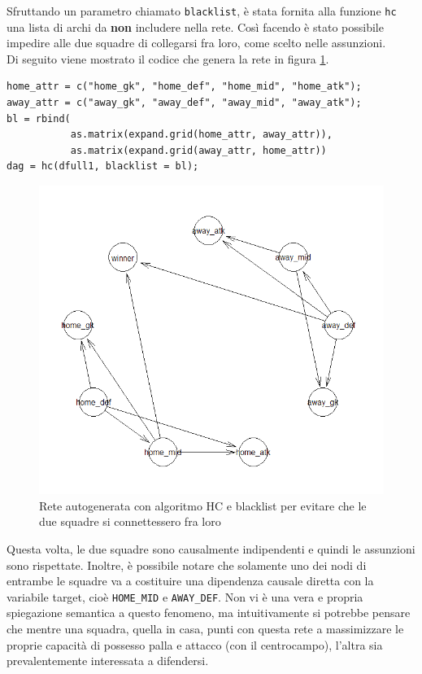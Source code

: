 \documentclass[hidelinks, 12pt]{article}
\begin{document}
Sfruttando un parametro chiamato \texttt{blacklist}, è stata fornita alla funzione \texttt{hc} una lista di archi da \textbf{non} includere nella rete. Così facendo è stato possibile impedire alle due squadre di collegarsi fra loro, come scelto nelle assunzioni. \\
Di seguito viene mostrato il codice che genera la rete in figura \ref{img:hc-bl}.

\begin{verbatim}
home_attr = c("home_gk", "home_def", "home_mid", "home_atk");
away_attr = c("away_gk", "away_def", "away_mid", "away_atk");
bl = rbind(
           as.matrix(expand.grid(home_attr, away_attr)),
           as.matrix(expand.grid(away_attr, home_attr))
dag = hc(dfull1, blacklist = bl);
\end{verbatim}

\begin{figure}[H]
	\centering
	\includegraphics[scale=0.8]{images/05_02_hc_bl.png}
	\caption[Rete autogenerata con algoritmo HC e blacklist per evitare che le due squadre si connettessero fra loro]{Rete autogenerata con algoritmo HC e blacklist per evitare che le due squadre si connettessero fra loro}
	\label{img:hc-bl}
\end{figure}

Questa volta, le due squadre sono causalmente indipendenti e quindi le assunzioni sono rispettate. Inoltre, è possibile notare che solamente uno dei nodi di entrambe le squadre va a costituire una dipendenza causale diretta con la variabile target, cioè \texttt{HOME\_MID} e \texttt{AWAY\_DEF}. Non vi è una vera e propria spiegazione semantica a questo fenomeno, ma intuitivamente si potrebbe pensare che mentre una squadra, quella in casa, punti con questa rete a massimizzare le proprie capacità di possesso palla e attacco (con il centrocampo), l'altra sia prevalentemente interessata a difendersi.
\end{document}
